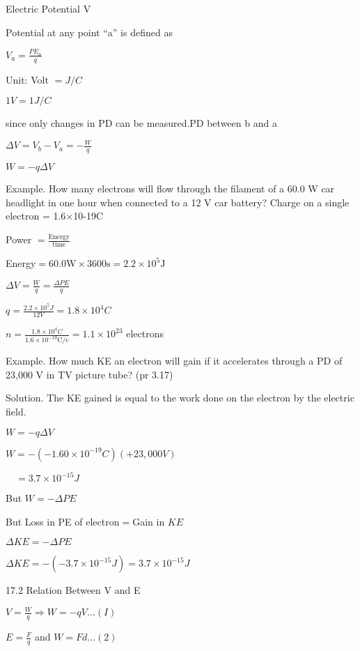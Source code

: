 \documentclass{extarticle}
\begin{document}
Electric Potential V

Potential at any point “a”
is defined as



$V_{a}=\frac{P E_{a}}{q}$

Unit: Volt $=J / C$

$1 V=1 J / C$

since only changes in PD can be measured.PD between b and a

$\Delta V=V_{b}-V_{a}=-\frac{W}{q}$

$W=-q \Delta V$





Example. How many electrons will flow through the filament of
a 60.0 W car headlight in one hour when connected to a 12 V
car battery? Charge on a single electron = 1.6×10-19C

Power $=\frac{\text {Energy}}{\text {time}}$

Energy$=60.0 \mathrm{W} \times 3600 \mathrm{s}=2.2 \times 10^{5} \mathrm{J}$

$\Delta V=\frac{W}{q}=\frac{\Delta P E}{q}$

$q=\frac{2.2 \times 10^{5} J}{12 V}=1.8 \times 10^{4} C$

$n=\frac{1.8 \times 10^{4} C}{1.6 \times 10^{-19} \mathrm{C} / e}=1.1 \times 10^{23}$ electrons




Example. How much KE an electron will gain if it accelerates
through a PD of 23,000 V in TV picture tube? (pr 3.17)

Solution. The KE gained is equal to the work done on the
electron by the electric field.

$W=-q \Delta V$

$W=-\left(-1.60 \times 10^{-19} C\right)(+23,000 V)$

$\quad=3.7 \times 10^{-15} J$

But $W=-\Delta P E$

But Loss in PE of electron$=$Gain in $K E$

$\Delta K E=-\Delta P E$

$\Delta K E=-\left(-3.7 \times 10^{-15} J\right)=3.7 \times 10^{-15} J$





17.2 Relation Between V and E

$V=\frac{W}{q} \Rightarrow W=-q V \ldots(I)$

$E=\frac{F}{q}$ and $W=F d \ldots(2)$
\end{document}
